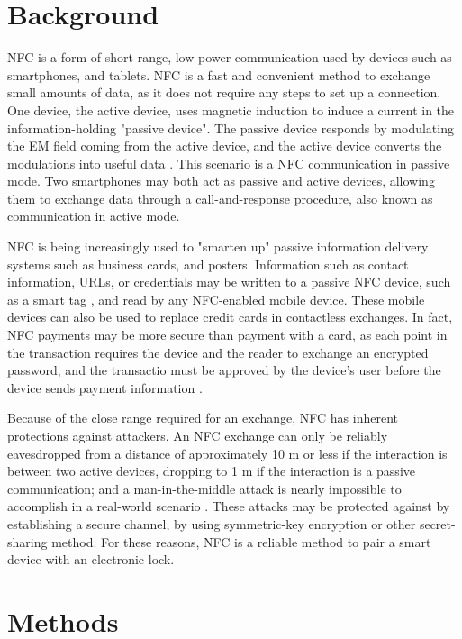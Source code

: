\documentclass{article}
\begin{document}
\section{Background}

NFC is a form of short-range, low-power communication used by devices such as smartphones, and tablets. NFC is a fast
and convenient method to exchange small amounts of data, as it does not require any steps to set up a connection. One
device, the active device, uses magnetic induction to induce a current in the information-holding "passive device". The
passive device responds by modulating the EM field coming from the active device, and the active device converts the
modulations into useful data \autocite{NFCORG}. This scenario is a NFC communication in passive mode. Two smartphones
may both act as passive and active devices, allowing them to exchange data through a call-and-response procedure, also
known as communication in active mode.

NFC is being increasingly used to "smarten up" passive information delivery systems such as business cards, and posters.
Information such as contact information, URLs, or credentials may be written to a passive NFC device, such as a smart
tag \autocite{NFCFORUMWHATIS}, and read by any NFC-enabled mobile device. These mobile devices can also be used to
replace credit cards in contactless exchanges. In fact, NFC payments may be more secure than payment with a card, as
each point in the transaction requires the device and the reader to exchange an encrypted password, and the transactio
 must be approved by the device's user before the device sends payment information \autocite{NFCPAYMENT}.

Because of the close range required for an exchange, NFC has inherent protections against attackers. An NFC exchange
can only be reliably eavesdropped from a distance of approximately 10 m or less if the interaction is between two active
devices, dropping to 1 m if the interaction is a passive communication; and a man-in-the-middle attack is nearly
impossible to accomplish in a real-world scenario \autocite{NFCSECURITY}. These attacks may be protected against by
establishing a secure channel, by using symmetric-key encryption or other secret-sharing method. For these reasons,
NFC is a reliable method to pair a smart device with an electronic lock.

\section{Methods}
\end{document}
